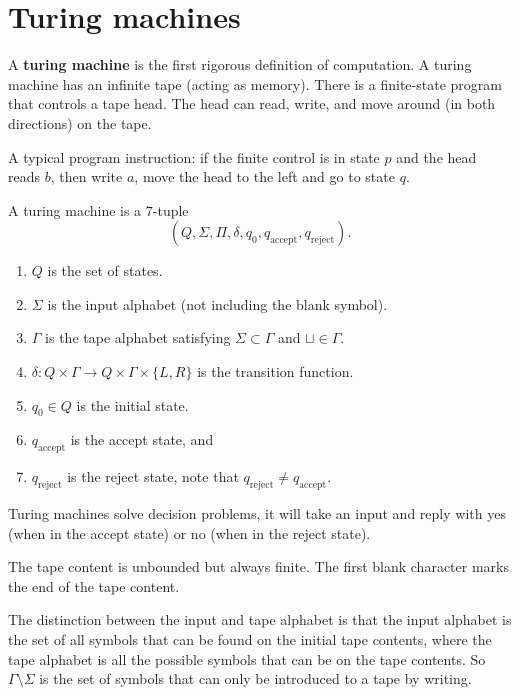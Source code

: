 \chapter{Turing machines}

A \textbf{turing machine} is the first rigorous definition of computation. A turing machine has an infinite tape (acting as memory). There is a finite-state program that controls a tape head. The head can read, write, and move around (in both directions) on the tape.

\begin{example}
    A typical program instruction: if the finite control is in state $p$ and the head reads $b$, then write $a$, move the head to the left and go to state $q$. 
\end{example}

\begin{definition}
    A turing machine is a $7$-tuple \[(Q, \Sigma, \Pi, \delta, q_0, q_{\text{accept}}, q_{\text{reject}}).\]
    \begin{enumerate}
        \item $Q$ is the set of states.
        \item $\Sigma$ is the input alphabet (not including the blank symbol).
        \item $\Gamma$ is the tape alphabet satisfying $\Sigma \subset \Gamma$ and $\sqcup \in \Gamma$.
        \item $\delta: Q \times \Gamma \to Q \times \Gamma \times \{ L, R \}$ is the transition function.
        \item $q_0 \in Q$ is the initial state.
        \item $q_{\text{accept}}$ is the accept state, and
        \item $q_{\text{reject}}$ is the reject state, note that $q_{\text{reject}} \neq q_{\text{accept}}$.
    \end{enumerate}
\end{definition}

Turing machines solve decision problems, it will take an input and reply with yes (when in the accept state) or no (when in the reject state).

The tape content is unbounded but always finite. The first blank character marks the end of the tape content.

\begin{remark}
    The distinction between the input and tape alphabet is that the input alphabet is the set of all symbols that can be found on the initial tape contents, where the tape alphabet is all the possible symbols that can be on the tape contents. So $\Gamma \setminus \Sigma$ is the set of symbols that can only be introduced to a tape by writing.
\end{remark}

